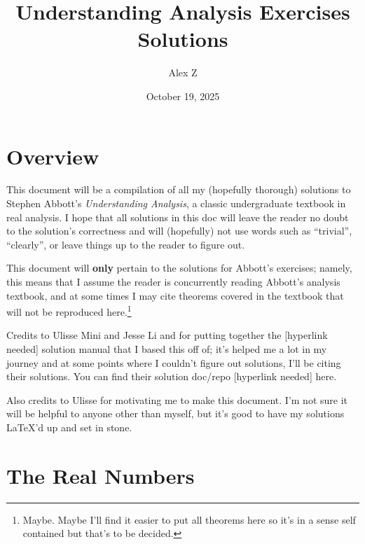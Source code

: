 \documentclass[12pt]{article}
\title{Understanding Analysis Exercises Solutions}
\author{Alex Z}
\date{October 19, 2025} %
\theoremstyle{definition}
\begin{document}
 
\maketitle
\newpage


\section*{Overview}

This document will be a compilation of all my (hopefully thorough) solutions to Stephen Abbott's \textit{Understanding Analysis}, a classic undergraduate textbook in real analysis. I hope that all solutions in this doc will leave the reader no doubt to the solution's correctness and will (hopefully) not use words such as ``trivial'', ``clearly'', or leave things up to the reader to figure out.

This document will \textbf{only} pertain to the solutions for Abbott's exercises; namely, this means that I assume the reader is concurrently reading Abbott's analysis textbook, and at some times I may cite theorems covered in the textbook that will not be reproduced here.\footnote{Maybe. Maybe I'll find it easier to put all theorems here so it's in a sense self contained but that's to be decided.}

Credits to Ulisse Mini and Jesse Li and for putting together the [hyperlink needed] solution manual that I based this off of; it's helped me a lot in my journey and at some points where I couldn't figure out solutions, I'll be citing their solutions. You can find their solution doc/repo [hyperlink needed] here.

Also credits to Ulisse for motivating me to make this document. I'm not sure it will be helpful to anyone other than myself, but it's good to have my solutions \LaTeX'd up and set in stone.

\newpage


\tableofcontents
\newpage 




\section{The Real Numbers}
\end{document}
